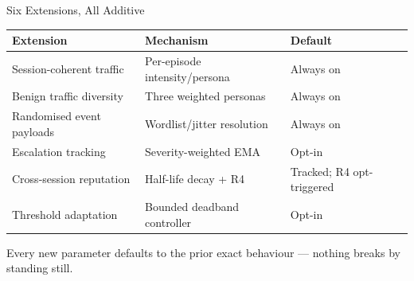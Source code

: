 \documentclass[aspectratio=169, 12pt]{beamer}
\begin{document}
\begin{frame}{Six Extensions, All Additive}
  \begin{center}
    \small
    \begin{tabular}{p{4.2cm}p{5.4cm}p{2.4cm}}
      \toprule
      \textbf{Extension} & \textbf{Mechanism} & \textbf{Default} \\
      \midrule
      Session-coherent traffic & Per-episode intensity/persona & Always on \\
      Benign traffic diversity & Three weighted personas & Always on \\
      Randomised event payloads & Wordlist/jitter resolution & Always on \\
      Escalation tracking & Severity-weighted EMA & Opt-in \\
      Cross-session reputation & Half-life decay + R4 & Tracked; R4 opt-triggered \\
      Threshold adaptation & Bounded deadband controller & Opt-in \\
      \bottomrule
    \end{tabular}
  \end{center}
  \vspace{0.3cm}
  \begin{center}
    \textcolor{honeygrey}{\small Every new parameter defaults to the prior exact
    behaviour --- nothing breaks by standing still.}
  \end{center}
\end{frame}
\end{document}

